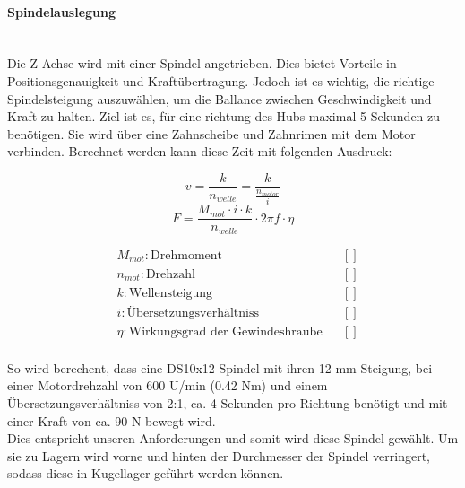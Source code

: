 \paragraph{Spindelauslegung}\mbox{}\\
Die Z-Achse wird mit einer Spindel angetrieben. Dies bietet Vorteile in Positionsgenauigkeit und Kraftübertragung. Jedoch ist es wichtig, die richtige Spindelsteigung auszuwählen, um die Ballance zwischen Geschwindigkeit und Kraft zu halten. Ziel ist es, für eine richtung des Hubs maximal 5 Sekunden zu benötigen. Sie wird über eine Zahnscheibe und Zahnrimen mit dem Motor verbinden.
Berechnet werden kann diese Zeit mit folgenden Ausdruck:

\vspace{5mm}
\noindent\begin{minipage}{\textwidth}
\begin{minipage}[t]{0.5\textwidth}
    \begin{equation*}
        v = \frac{k}{n_{welle}} = \frac{k}{\frac{n_{motor}}{i}}
    \end{equation*}
    \begin{equation*}
        F = \frac{M_{mot} \cdot i \cdot k}{n_{welle}} \cdot 2 \pi f \cdot \eta 
    \end{equation*}
\end{minipage}%
\begin{minipage}[t]{0.5\textwidth}
    \vspace{-7mm}
    \begin{align*}
        &M_{mot}: \text{Drehmoment} & &\left[\right]\\
        &n_{mot}: \text{Drehzahl} & &\left[\right]\\
        &k: \text{Wellensteigung} & &\left[\right]\\
        &i: \text{Übersetzungsverhältniss} & &\left[\right]\\
        &\eta: \text{Wirkungsgrad der Gewindeshraube} & &\left[\right]\\
    \end{align*}
\end{minipage}
\end{minipage}

\vspace{5mm}

So wird berechent, dass eine DS10x12 Spindel mit ihren 12 mm Steigung, bei einer Motordrehzahl von 600 U/min (0.42 Nm) und einem Übersetzungsverhältniss von 2:1, ca. 4 Sekunden pro Richtung benötigt und mit einer Kraft von ca. 90 N bewegt wird. \\Dies entspricht unseren Anforderungen und somit wird diese Spindel gewählt. Um sie zu Lagern wird vorne und hinten der Durchmesser der Spindel verringert, sodass diese in Kugellager geführt werden können.

